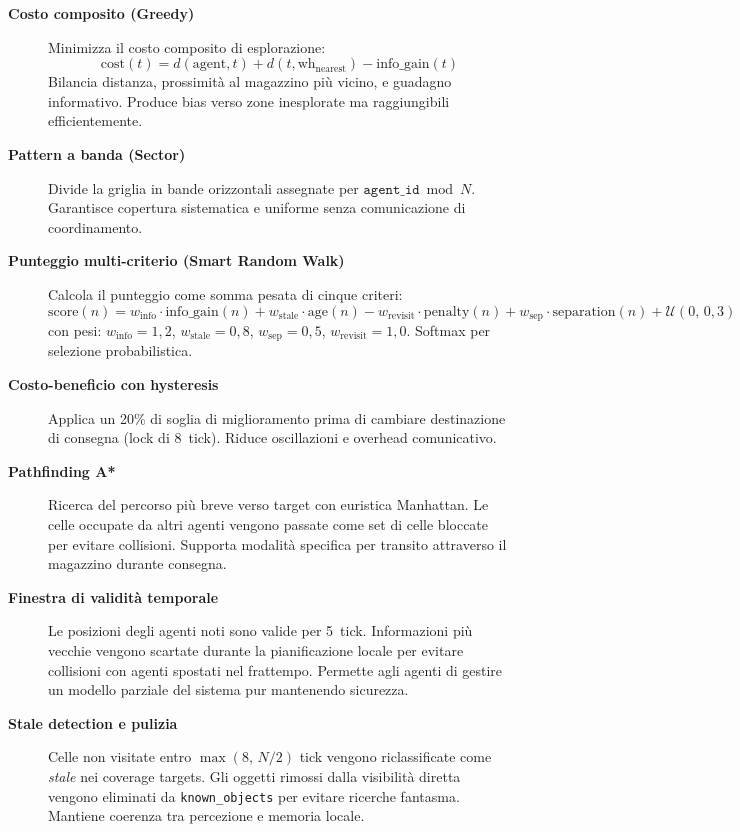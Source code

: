 \begin{description}
  \item[\textbf{Costo composito (Greedy)}]
        Minimizza il costo composito di esplorazione:
        $$\text{cost}(t) = d(\text{agent}, t) + d(t, \text{wh}_{\text{nearest}}) - \text{info\_gain}(t)$$
        Bilancia distanza, prossimit\`a al magazzino pi\`u vicino, e guadagno informativo.
        Produce bias verso zone inesplorate ma raggiungibili efficientemente.
  
  \item[\textbf{Pattern a banda (Sector)}]
        Divide la griglia in bande orizzontali assegnate per $\texttt{agent\_id} \bmod N$.
        Garantisce copertura sistematica e uniforme senza comunicazione di coordinamento.
  
  \item[\textbf{Punteggio multi-criterio (Smart Random Walk)}]
        Calcola il punteggio come somma pesata di cinque criteri:
        $$\text{score}(n) = w_{\text{info}} \cdot \text{info\_gain}(n) + w_{\text{stale}} \cdot \text{age}(n)
        - w_{\text{revisit}} \cdot \text{penalty}(n) + w_{\text{sep}} \cdot \text{separation}(n) + \mathcal{U}(0,\,0{,}3)$$
        con pesi: $w_{\text{info}}=1{,}2$, $w_{\text{stale}}=0{,}8$, $w_{\text{sep}}=0{,}5$, $w_{\text{revisit}}=1{,}0$.
        Softmax per selezione probabilistica.
  
  \item[\textbf{Costo-beneficio con hysteresis}]
        Applica un 20\% di soglia di miglioramento prima di cambiare destinazione di consegna
        (lock di 8~tick). Riduce oscillazioni e overhead comunicativo.
  
  \item[\textbf{Pathfinding A*}]
        Ricerca del percorso pi\`u breve verso target con euristica Manhattan. Le celle occupate
        da altri agenti vengono passate come set di celle bloccate per evitare collisioni.
        Supporta modalit\`a specifica per transito attraverso il magazzino durante consegna.
  
  \item[\textbf{Finestra di validit\`a temporale}]
        Le posizioni degli agenti noti sono valide per 5~tick. Informazioni pi\`u vecchie
        vengono scartate durante la pianificazione locale per evitare collisioni con
        agenti spostati nel frattempo. Permette agli agenti di gestire un modello parziale
        del sistema pur mantenendo sicurezza.
  
  \item[\textbf{Stale detection e pulizia}]
        Celle non visitate entro $\max(8,\,N/2)$ tick vengono riclassificate come \textit{stale}
        nei coverage targets. Gli oggetti rimossi dalla visibilità diretta vengono eliminati da
        \texttt{known\_objects} per evitare ricerche fantasma. Mantiene coerenza tra percezione
        e memoria locale.
  

\end{description}
